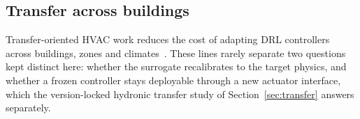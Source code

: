 \subsection{Transfer across buildings}
Transfer-oriented HVAC work reduces the cost of adapting DRL controllers across buildings, zones and
climates~\cite{Hou2024MultiSource,Coraci2024HeteroTL,Coraci2025HiLo}. These lines
rarely separate two questions kept distinct here: whether the surrogate recalibrates to the target
physics, and whether a frozen controller stays deployable through a new actuator interface, which
the version-locked hydronic transfer study of Section~\ref{sec:transfer} answers separately.
